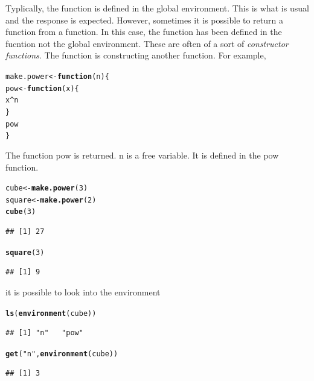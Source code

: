 \documentclass{article}\usepackage{graphicx, color}
\makeatletter
\newcommand{\hlfunctioncall}[1]{\textcolor[rgb]{0.501960784313725,0,0.329411764705882}{\textbf{#1}}}%
\newcommand{\hlstring}[1]{\textcolor[rgb]{0.6,0.6,1}{#1}}%
\newenvironment{kframe}{%
 \def\at@end@of@kframe{}%
 \ifinner\ifhmode%
  \def\at@end@of@kframe{\end{minipage}}%
  \begin{minipage}{\columnwidth}%
 \fi\fi%
 \def\FrameCommand##1{\hskip\@totalleftmargin \hskip-\fboxsep
 \colorbox{shadecolor}{##1}\hskip-\fboxsep
     \hskip-\linewidth \hskip-\@totalleftmargin \hskip\columnwidth}%
 \MakeFramed {\advance\hsize-\width
   \@totalleftmargin\z@ \linewidth\hsize
   \@setminipage}}%
 {\par\unskip\endMakeFramed%
 \at@end@of@kframe}
\newenvironment{knitrout}{}{} %
\makeatother
\begin{document}
Typlically, the function is defined in the global environment.  This is what is usual and the response is expected.  However, sometimes it is possible to return a function from a function.  In this case, the function has been defined in the fucntion not the global environment.  These are often of a sort of \emph{constructor functions}.  The function is constructing another function. For example, 
\begin{knitrout}
\color{fgcolor}\begin{kframe}
\begin{alltt}
make.power <- \hlfunctioncall{function}(n) \{
    pow <- \hlfunctioncall{function}(x) \{
        x^n
    \}
    pow
\}
\end{alltt}
\end{kframe}
\end{knitrout}

The function pow is returned.  n is a free variable.  It is defined in the pow function.  
\begin{knitrout}
\color{fgcolor}\begin{kframe}
\begin{alltt}
cube <- \hlfunctioncall{make.power}(3)
square <- \hlfunctioncall{make.power}(2)
\hlfunctioncall{cube}(3)
\end{alltt}
\begin{verbatim}
## [1] 27
\end{verbatim}
\begin{alltt}
\hlfunctioncall{square}(3)
\end{alltt}
\begin{verbatim}
## [1] 9
\end{verbatim}
\end{kframe}
\end{knitrout}

it is possible to look into the environment 
\begin{knitrout}
\color{fgcolor}\begin{kframe}
\begin{alltt}
\hlfunctioncall{ls}(\hlfunctioncall{environment}(cube))
\end{alltt}
\begin{verbatim}
## [1] "n"   "pow"
\end{verbatim}
\begin{alltt}
\hlfunctioncall{get}(\hlstring{"n"}, \hlfunctioncall{environment}(cube))
\end{alltt}
\begin{verbatim}
## [1] 3
\end{verbatim}
\end{kframe}
\end{knitrout}
\end{document}
